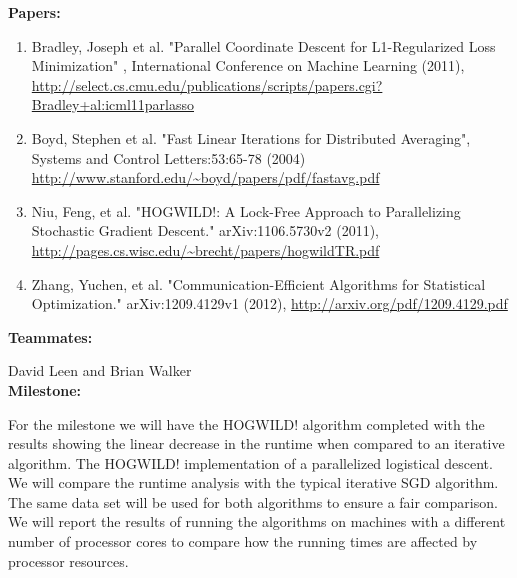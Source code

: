 \documentclass{article}
\begin{document}
\textbf{Papers:}
	\begin{enumerate}
		\item Bradley, Joseph et al. "Parallel Coordinate Descent for L1-Regularized Loss Minimization" , International Conference on Machine Learning (2011), 
			\url{http://select.cs.cmu.edu/publications/scripts/papers.cgi?Bradley+al:icml11parlasso}
		\item Boyd, Stephen et al. "Fast Linear Iterations for Distributed Averaging", Systems and Control Letters:53:65-78 (2004)
			\url{http://www.stanford.edu/~boyd/papers/pdf/fastavg.pdf}
		\item Niu, Feng, et al. "HOGWILD!: A Lock-Free Approach to Parallelizing Stochastic Gradient Descent." arXiv:1106.5730v2 (2011), 
			\url{http://pages.cs.wisc.edu/~brecht/papers/hogwildTR.pdf}	
		\item Zhang, Yuchen, et al. "Communication-Efficient Algorithms for Statistical Optimization." arXiv:1209.4129v1 (2012), 
			\url{http://arxiv.org/pdf/1209.4129.pdf}
	\end{enumerate}
	
\textbf{Teammates:} 

David Leen and Brian Walker\\

\textbf{Milestone:}

For the milestone we will have the HOGWILD! algorithm completed with the results showing the linear decrease in the runtime when compared to an iterative algorithm.  The HOGWILD! implementation of a parallelized logistical descent. We will compare the runtime analysis with the typical iterative SGD algorithm.  The same data set will be used for both algorithms to ensure a fair comparison.  We will report the results of running the algorithms on machines with a different number of processor cores to compare how the running times are affected by processor resources.
\end{document}
